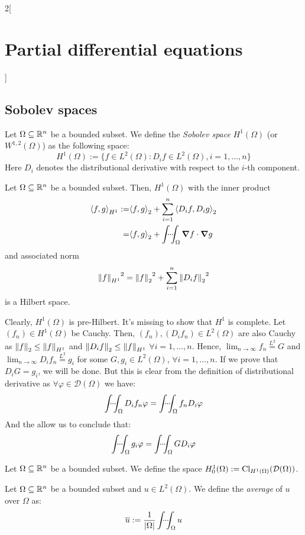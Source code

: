 \documentclass[../../../main_math.tex]{subfiles}
\begin{document}
\begin{multicols}{2}[\section{Partial differential equations}]
  \subsection{Sobolev spaces}
  \begin{definition}
    Let $\Omega\subseteq \mathbb{R}^n$ be a bounded subset. We define the \emph{Sobolev space} $H^1(\Omega)$ (or $W^{1,2}(\Omega)$) as the following space: $$H^1(\Omega):=\{f\in L^2(\Omega):D_if\in L^2(\Omega), i=1,\ldots,n\}$$
    Here $D_i$ denotes the distributional derivative with respect to the $i$-th component.
  \end{definition}
  \begin{proposition}
    Let $\Omega\subseteq \mathbb{R}^n$ be a bounded subset. Then, $H^1(\Omega)$ with the inner product
    \begin{align*}
      {\left\langle f,g\right\rangle}_{H^1} := & {\left\langle f,g\right\rangle}_{2}+\sum_{i=1}^n{\left\langle D_if,D_ig\right\rangle}_{2}       \\
      =                    & {\left\langle f,g\right\rangle}_{2}+\idotsint_\Omega \grad{f}\cdot \grad{g}
    \end{align*}
    and associated norm
    $${\left\|f\right\|_{H^1}}^2={\left\|f\right\|_2}^2 +\sum_{i=1}^n{\left\|D_if\right\|_2}^2$$
    is a Hilbert space.
  \end{proposition}
  \begin{sproof}
    Clearly, $H^1(\Omega)$ is pre-Hilbert. It's missing to show that $H^1$ is complete. Let $(f_n)\in H^1(\Omega)$ be Cauchy. Then, $(f_n), (D_if_n)\in L^2(\Omega)$ are also Cauchy as $\left\|f\right\|_2\leq \left\|f\right\|_{H^1}$ and $\left\|D_if\right\|_2\leq \left\|f\right\|_{H^1}$ $\forall i=1,\ldots,n$. Hence, $\displaystyle\lim_{n\to\infty}f_n\overset{L^2}{=}G$ and $\displaystyle\lim_{n\to\infty}D_if_n\overset{L^2}{=}g_i$ for some $G,g_i\in L^2(\Omega)$, $\forall i=1,\ldots,n$. If we prove that $D_iG=g_i$, we will be done. But this is clear from the definition of distributional derivative as $\forall\varphi\in\mathcal{D}(\Omega)$ we have:
    $$\idotsint_\Omega D_if_n\varphi =\idotsint_\Omega f_n D_i\varphi$$
    And the  allow us to conclude that:
    $$\idotsint_\Omega g_i\varphi =\idotsint_\Omega G D_i\varphi$$
  \end{sproof}
  \begin{definition}
    Let $\Omega\subseteq \mathbb{R}^n$ be a bounded subset. We define the space $H_0^1(\Omega):=\operatorname{Cl}_{H^1(\Omega)}(\mathcal{D}(\Omega))$.
  \end{definition}
  \begin{definition}
    Let $\Omega\subseteq \mathbb{R}^n$ be a bounded subset and $u\in L^2(\Omega)$. We define the \emph{average} of $u$ over $\Omega$ as: $$\overline{u}:=\frac{1}{\m{\Omega}}\idotsint_\Omega u$$

\end{definition}
\end{multicols}
\end{document}

